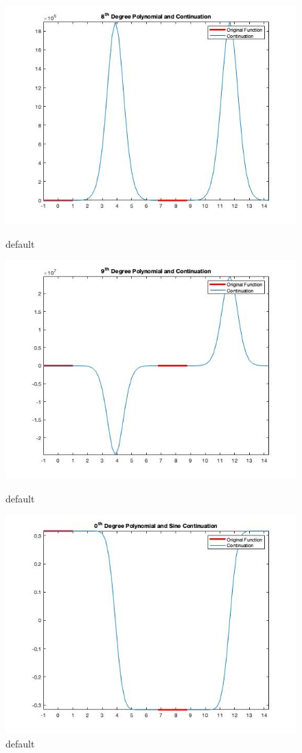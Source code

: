\documentclass[11pt]{amsart}
\begin{document}
\begin{figure}[htbp]
\begin{center}
\includegraphics[scale=0.5]{EightDegreeContinuation.jpg}
\caption{default}
\label{default}



\includegraphics[scale=0.5]{NinthDegreeContinuation.jpg}
\caption{default}
\label{default}


\includegraphics[scale=0.5]{ZeroDegreeSineCont.jpg}
\caption{default}
\label{default}





\end{center}
\end{figure}
\end{document}
